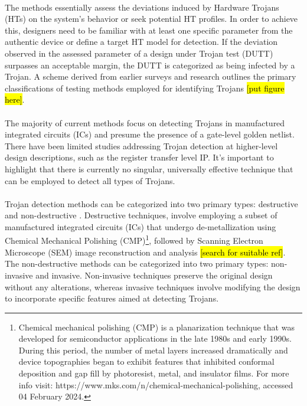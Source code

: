 \paragraph*{}
The methods essentially assess the deviations induced by Hardware Trojans (HTs) on the system's behavior or seek potential HT profiles. In order to achieve this, designers need to be familiar with at least one specific parameter from the authentic device or define a target HT model for detection. If the deviation observed in the assessed parameter of a design under Trojan test (DUTT) surpasses an acceptable margin, the DUTT is categorized as being infected by a Trojan. A scheme derived from earlier surveys and research outlines the primary classifications of testing methods employed for identifying Trojans \hl {[put figure here]}.
\paragraph*{}
The majority of current methods focus on detecting Trojans in manufactured integrated circuits (ICs) and presume the presence of a gate-level golden netlist. There have been limited studies addressing Trojan detection at higher-level design descriptions, such as the register transfer level IP. It's important to highlight that there is currently no singular, universally effective technique that can be employed to detect all types of Trojans.
\paragraph*{}
Trojan detection methods can be categorized into two primary types: destructive and non-destructive \cite{tehranipoor2011introduction}. Destructive techniques, involve employing a subset of manufactured integrated circuits (ICs) that undergo de-metallization using Chemical Mechanical Polishing (CMP)\footnote{Chemical mechanical polishing (CMP) is a planarization technique that was developed for semiconductor applications in the late 1980s and early 1990s. During this period, the number of metal layers increased dramatically and device topographies began to exhibit features that inhibited conformal deposition and gap fill by photoresist, metal, and insulator films. For more info visit: https://www.mks.com/n/chemical-mechanical-polishing, accessed 04 February 2024.}, followed by Scanning Electron Microscope (SEM) image reconstruction and analysis \hl {[search for suitable ref]}. The non-destructive methods can be categorized into two primary types: non-invasive and invasive. Non-invasive techniques preserve the original design without any alterations, whereas invasive techniques involve modifying the design to incorporate specific features aimed at detecting Trojans.
